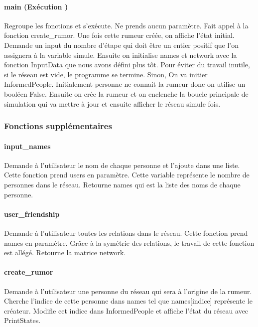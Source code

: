 \documentclass[a4paper,11pt]{article}
\begin{document}
\paragraph{main (Exécution )\newline}
{Regroupe les fonctions et s'exécute. Ne prends aucun paramètre.
Fait appel à la fonction create\_rumor. Une fois cette rumeur créée, on affiche l'état initial.
Demande un input du nombre d'étape qui doit être un entier positif que l'on assignera à la variable simule.
Ensuite on initialise names et network avec la fonction InputData que nous avons défini plus tôt.
Pour éviter du travail inutile, si le réseau est vide, le programme se termine. Sinon, On va initier InformedPeople.
Initialement personne ne connait la rumeur donc on utilise un booléen False.
Ensuite on crée la rumeur et on enclenche la boucle principale de simulation qui va mettre à jour et ensuite afficher le réseau simule fois.}
\subsubsection{Fonctions supplémentaires}
\paragraph{input\_names\newline}
{Demande à l'utilisateur le nom de chaque personne et l'ajoute dans une liste. Cette fonction prend users en paramètre.
Cette variable représente le nombre de personnes dans le réseau.\newline
Retourne names qui est la liste des noms de chaque personne.}
\paragraph{user\_friendship\newline}
{Demande à l'utilisateur toutes les relations dans le réseau. Cette fonction prend names en paramètre.
Grâce à la symétrie des relations, le travail de cette fonction est allégé.
Retourne la matrice network.}
\paragraph{create\_rumor\newline}
{Demande à l'utilisateur une personne du réseau qui sera à l'origine de la rumeur.
Cherche l'indice de cette personne dans names tel que names[indice] représente le créateur.
Modifie cet indice dans InformedPeople et affiche l'état du réseau avec PrintStates.}
\end{document}
